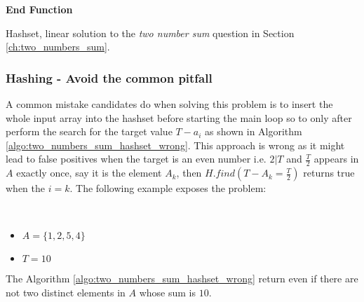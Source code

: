 \begin{algorithm}
	   
	
    \textbf{End Function}
	\caption{Hashset, linear solution to the \textit{two number sum} question in Section
	\label{algo:two_number_sum_hashset}	\ref{ch:two_numbers_sum}.}
\end{algorithm}

\begin{minipage}{\linewidth}
	
\end{minipage}

\subsubsection{Hashing - Avoid the common pitfall}
A common mistake candidates do when solving this problem is to insert the whole input array into the hashset 
before starting the main loop so to only after perform the search for the target value $T-a_i$ as shown in Algorithm
\ref{algo:two_numbers_sum_hashset_wrong}. 
This approach is wrong as it might lead to false positives when the target is an even number i.e. $ 2 | T$ and $\frac{T}{2}$ appears in $A$ exactly once, 
say it is the element $A_k$, then $H.find(T-A_k=\frac{T}{2})$ returns true when the $i=k$.
The following example exposes the problem:
\begin{example}
	\hfill \\ 
	\begin{itemize}
		\item[] $A=\{1,2,5,4\}$
	\item[] $T = 10$
\end{itemize}
The Algorithm \ref{algo:two_numbers_sum_hashset_wrong} return  even if there are not two
distinct elements in $A$ whose sum is $10$.
\end{example}

